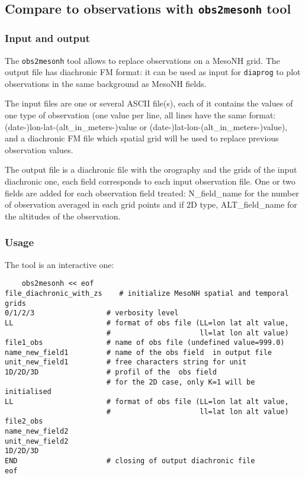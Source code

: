 \subsection{Compare to observations with 
\texttt{obs2mesonh} tool \label{obs2mnh}}
\subsubsection{Input and output}
The \texttt{obs2mesonh} tool allows to replace observations on a MesoNH grid.
The output file has diachronic FM format: it can be used as input for 
\texttt{diaprog} to plot observations in the same background as MesoNH fields.

The input files are one or several ASCII file(s), each of it contains the
values of one type of observation (one value per line, all lines have the same
format: (date-)lon-lat-(alt\_in\_meters-)value or 
(date-)lat-lon-(alt\_in\_meters-)value),
and a diachronic FM file which spatial grid will be
used to replace previous observation values.

The output file is a diachronic file with the orography and the grids of the
input diachronic one, each field corresponds to each input observation file.
One or two fields are added for each observation field treated: N\_field\_name 
for the number of observation averaged in each grid points and if 2D type, ALT\_field\_name for the altitudes of the observation.

\subsubsection{Usage}
The tool is an interactive one:
\begin{verbatim}
    obs2mesonh << eof
file_diachronic_with_zs    # initialize MesoNH spatial and temporal grids
0/1/2/3                 # verbosity level
LL                      # format of obs file (LL=lon lat alt value, 
                        #                     ll=lat lon alt value)
file1_obs               # name of obs file (undefined value=999.0)
name_new_field1         # name of the obs field  in output file
unit_new_field1         # free characters string for unit
1D/2D/3D                # profil of the  obs field 
                        # for the 2D case, only K=1 will be initialised
LL                      # format of obs file (LL=lon lat alt value, 
                        #                     ll=lat lon alt value)
file2_obs
name_new_field2
unit_new_field2
1D/2D/3D
END                     # closing of output diachronic file
eof
\end{verbatim}

